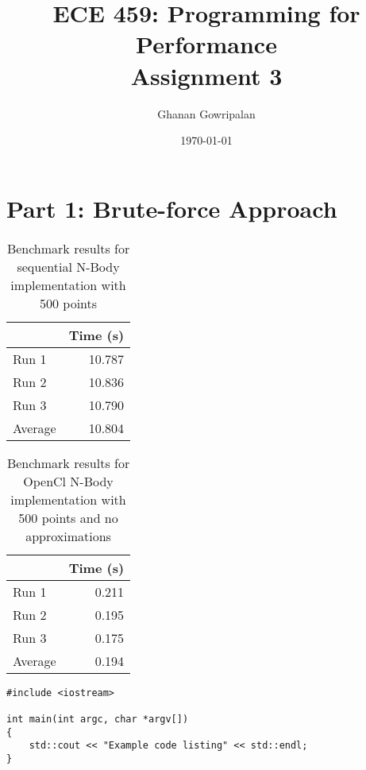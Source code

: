 \documentclass[12pt]{article}
\title{ECE 459: Programming for Performance\\Assignment 3}
\author{Ghanan Gowripalan}
\date{\today}
\begin{document}
\maketitle

\section*{Part 1: Brute-force Approach}


\begin{table}[H]
  \centering
  \begin{tabular}{lr}
    & {\bf Time (s)} \\
    \hline
    Run 1 & 10.787 \\
    Run 2 & 10.836 \\
    Run 3 & 10.790 \\
    \hline
    Average & 10.804
  \end{tabular}
  \caption{Benchmark results for sequential N-Body implementation with 500 points}
  \label{tbl-nbody-seq-500}
\end{table}


\begin{table}[H]
  \centering
  \begin{tabular}{lr}
    & {\bf Time (s)} \\
    \hline
    Run 1 & 0.211 \\
    Run 2 & 0.195 \\
    Run 3 & 0.175 \\
    \hline
    Average & 0.194
  \end{tabular}
  \caption{Benchmark results for OpenCl N-Body implementation with 500 points and no approximations}
  \label{tbl-nbody-gpu-500-no-approx}
\end{table}

\begin{lstlisting}
#include <iostream>

int main(int argc, char *argv[])
{
    std::cout << "Example code listing" << std::endl;
}
\end{lstlisting}
\end{document}
